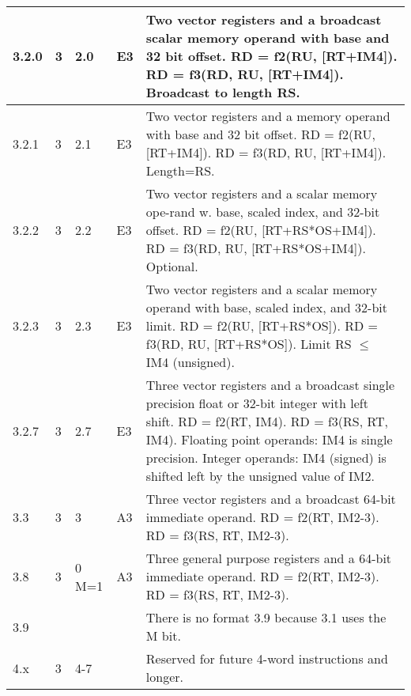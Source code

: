 \documentclass[forwardcom.tex]{subfiles}
\begin{document}
\begin{longtable} {|p{10mm}|p{6mm}|p{9mm}|p{7mm}|p{80mm}|}
\hline
3.2.0 & 3 & 2.0 & E3 & Two vector registers and a broadcast scalar memory operand with base and 32 bit offset.\newline 
RD = f2(RU, [RT+IM4]). RD = f3(RD, RU, [RT+IM4]). Broadcast to length RS.\\

\hline
3.2.1 & 3 & 2.1 & E3 & Two vector registers and a memory operand with base and 32 bit offset.\newline 
RD = f2(RU, [RT+IM4]). RD = f3(RD, RU, [RT+IM4]). Length=RS.\\

\hline
3.2.2 & 3 & 2.2 & E3 & Two vector registers and a scalar memory ope-rand w. base, scaled
index, and 32-bit offset.\newline 
RD = f2(RU, [RT+RS*OS+IM4]). RD = f3(RD, RU, [RT+RS*OS+IM4]). Optional.\\

\hline
3.2.3 & 3 & 2.3 & E3 & Two vector registers and a scalar memory operand with base, scaled index, and 32-bit limit.\newline 
RD = f2(RU, [RT+RS*OS]). RD = f3(RD, RU, [RT+RS*OS]). Limit RS $\leq$ IM4 (unsigned).\\

\hline
3.2.7 & 3 & 2.7 & E3 & Three vector registers and a broadcast single precision float or 32-bit integer with left shift.\newline 
RD = f2(RT, IM4). RD = f3(RS, RT, IM4).\newline
Floating point operands: IM4 is single precision.
Integer operands: IM4 (signed) is shifted left by the unsigned value of IM2. \\

\hline
3.3 & 3 & 3 & A3 & Three vector registers and a broadcast 64-bit immediate operand.\newline 
RD = f2(RT, IM2-3). RD = f3(RS, RT, IM2-3).\\

\hline
3.8 & 3 & 0 M=1 & A3 & Three general purpose registers and a 64-bit immediate operand. \newline 
RD = f2(RT, IM2-3). RD = f3(RS, RT, IM2-3).\\

\hline
3.9 &  &  &  & There is no format 3.9 because 3.1 uses the M bit.\\

\hline
4.x & 3 & 4-7 &  & Reserved for future 4-word instructions and longer. \\
\hline
\end{longtable}
\end{document}
